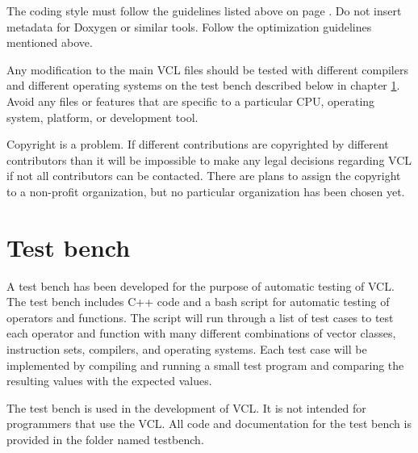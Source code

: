 \documentclass[vcl_manual.tex]{subfiles}
\begin{document}
The coding style must follow the guidelines listed above on page \pageref{CodingStyle}. Do not insert metadata for Doxygen or similar tools. Follow the optimization guidelines mentioned above.

Any modification to the main VCL files should be tested with different compilers and different operating systems on the test bench described below in chapter \ref{chap:TestBench}. Avoid any files or features that are specific to a particular CPU, operating system, platform, or development tool.

Copyright is a problem. If different contributions are copyrighted by different contributors than it will be impossible to make any legal decisions regarding VCL if not all contributors can be contacted. There are plans to assign the copyright to a non-profit organization, but no particular organization has been chosen yet.


\section{Test bench}\label{chap:TestBench}
A test bench has been developed for the purpose of automatic testing of VCL.
The test bench includes C++ code and a bash script for automatic testing of operators and functions. The script will run through a list of test cases to test each operator and function with many different combinations of vector classes, instruction sets, compilers, and operating systems. Each test case will be implemented by compiling and running a small test program and comparing the resulting values with the expected values.

The test bench is used in the development of VCL. It is not intended for programmers that use the VCL. All code and documentation for the test bench is provided in the folder named testbench.
\end{document}
